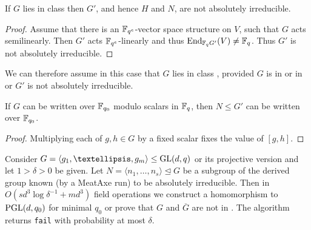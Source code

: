 \begin{Lemm}
\label{C3notabsirred}
If $G$ lies in class  then $G'$, and 
hence $H$ and $N$, are not absolutely irreducible.
\end{Lemm}
\begin{proof}
Assume that there is  an $\mathbb{F}_{q^e}$-vector space
structure on $V$, such that $G$ acts
semilinearly. Then
$G'$ acts $\mathbb{F}_{q^e}$-linearly and thus $\End_{\F_q
G'}(V) \neq \F_q$. Thus $G'$ is not absolutely
irreducible.
\end{proof}


We can therefore assume in this case that $G$
lies in class , provided $G$ is in  or in  or 
$G'$ is not absolutely irreducible.

\begin{Lemm} 
If\/ $G$ can be written over $\mathbb{F}_{q_0}$ modulo scalars in $\mathbb{F}_q$, 
then $N \leq G'$ can be written over $\mathbb{F}_{q_0}$.
\end{Lemm}

\begin{proof}
Multiplying each of $g, h \in G$ by
a fixed scalar fixes  the value of $[g, h]$.
\end{proof}




\begin{Theo} [Recognition of \CC5]
Consider $G = \langle g_1, \ldots, g_m \rangle 
\leq \GL(d, q)$ or its projective version and let $1 > \delta > 0$ be given. 
Let $N = \langle n_1, \ldots, n_s \rangle \unlhd G$ be a subgroup of the
derived group known (by
a MeatAxe run) to be absolutely irreducible. 
Then in $O(sd^3 \log \delta^{-1} + md^3)$ field operations
we construct a homomorphism to $\PGL(d, q_0)$ for minimal $q_0$
 or prove that $G$ and
$\overline{G}$ are not in . The algorithm returns {\tt fail} with
probability at most $\delta$.
\end{Theo}

